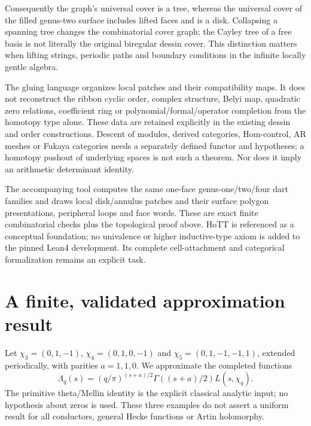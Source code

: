 \documentclass[11pt]{article}
\theoremstyle{definition}\newtheorem{definition}[theorem]{Definition}
\theoremstyle{remark}\newtheorem{remark}[theorem]{Remark}
\begin{document}
Consequently the graph's universal cover is a tree, whereas the universal
cover of the filled genus-two surface includes lifted faces and is a disk.
Collapsing a spanning tree changes the combinatorial cover graph; the Cayley
tree of a free basis is not literally the original biregular dessin cover.
This distinction matters when lifting strings, periodic paths and boundary
conditions in the infinite locally gentle algebra.

The gluing language organizes local patches and their compatibility maps.
It does not reconstruct the ribbon cyclic order, complex structure, Belyi
map, quadratic zero relations, coefficient ring or polynomial/formal/operator
completion from the homotopy type alone. These data are retained explicitly
in the existing dessin and order constructions. Descent of modules, derived
categories, Hom-control, AR meshes or Fukaya categories needs a separately
defined functor and hypotheses; a homotopy pushout of underlying spaces is
not such a theorem. Nor does it imply an arithmetic determinant identity.

The accompanying tool computes the same one-face genus-one/two/four dart
families and draws local disk/annulus patches and their surface polygon
presentations, peripheral loops and face words. These
are exact finite combinatorial checks plus the topological proof above.
HoTT is referenced as a conceptual foundation; no univalence or higher
inductive-type axiom is added to the pinned Lean4 development. Its complete
cell-attachment and categorical formalization remains an explicit task.


\section{A finite, validated approximation result}
Let $\chi_3=(0,1,-1)$, $\chi_4=(0,1,0,-1)$ and
$\chi_5=(0,1,-1,-1,1)$, extended periodically, with parities $a=1,1,0$.
We approximate the completed functions
\[
 \Lambda_q(s)=(q/\pi)^{(s+a)/2}\Gamma((s+a)/2)L(s,\chi_q).
\]
The primitive theta/Mellin identity is the explicit classical analytic input;
no hypothesis about zeros is used. These three examples do not assert a
uniform result for all conductors, general Hecke functions or Artin holomorphy.
\end{document}

